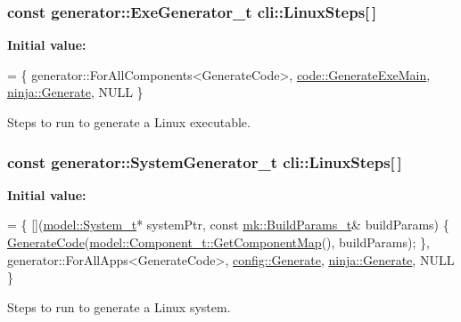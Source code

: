 \subsubsection[{\texorpdfstring{Linux\+Steps}{LinuxSteps}}]{\setlength{\rightskip}{0pt plus 5cm}const {\bf generator\+::\+Exe\+Generator\+\_\+t} cli\+::\+Linux\+Steps\mbox{[}$\,$\mbox{]}\hspace{0.3cm}{\ttfamily [static]}}\hypertarget{namespacecli_ad23f143312140a2565a854d9f79bb5ad}{}\label{namespacecli_ad23f143312140a2565a854d9f79bb5ad}
{\bfseries Initial value\+:}
\begin{DoxyCode}
=
\{
    generator::ForAllComponents<GenerateCode>,
    \hyperlink{namespacecode_ae2f9380152f6c0ae3e490b091374fdc5}{code::GenerateExeMain},
    \hyperlink{namespaceninja_a09e306ee7633de552e4384a80ede442f}{ninja::Generate},
    NULL
\}
\end{DoxyCode}


Steps to run to generate a Linux executable. 

\subsubsection[{\texorpdfstring{Linux\+Steps}{LinuxSteps}}]{\setlength{\rightskip}{0pt plus 5cm}const {\bf generator\+::\+System\+Generator\+\_\+t} cli\+::\+Linux\+Steps\mbox{[}$\,$\mbox{]}\hspace{0.3cm}{\ttfamily [static]}}\hypertarget{namespacecli_abfa92abddb595e14a7e865ca60a7de47}{}\label{namespacecli_abfa92abddb595e14a7e865ca60a7de47}
{\bfseries Initial value\+:}
\begin{DoxyCode}
=
\{
    [](\hyperlink{structmodel_1_1_system__t}{model::System\_t}* systemPtr, \textcolor{keyword}{const} \hyperlink{structmk_1_1_build_params__t}{mk::BuildParams\_t}& buildParams)
    \{
        \hyperlink{namespacecli_a10febdedb75bc753ace72299f10c495b}{GenerateCode}(\hyperlink{structmodel_1_1_component__t_a0c08ea593c884dea5b2d5e3cca8a5324}{model::Component\_t::GetComponentMap}(), 
      buildParams);
    \},
    generator::ForAllApps<GenerateCode>,
    \hyperlink{namespaceconfig_a4c08a9ee3d0b2b8990b57ee0b02b7826}{config::Generate},
    \hyperlink{namespaceninja_a09e306ee7633de552e4384a80ede442f}{ninja::Generate},
    NULL
\}
\end{DoxyCode}


Steps to run to generate a Linux system. 

